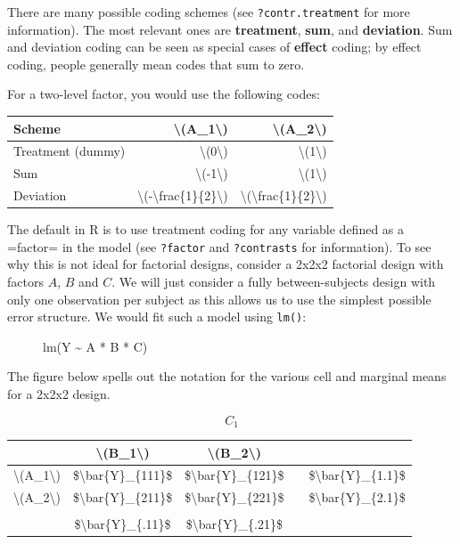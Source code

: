 \documentclass[]{book}
\begin{document}
There are many possible coding schemes (see \texttt{?contr.treatment} for more information). The most relevant ones are \textbf{treatment}, \textbf{sum}, and \textbf{deviation}. Sum and deviation coding can be seen as special cases of \textbf{effect} coding; by effect coding, people generally mean codes that sum to zero.

For a two-level factor, you would use the following codes:

\begin{table}[H]
\centering
\begin{tabular}{l|r|r}
\hline
Scheme & \textbackslash{}(A\_1\textbackslash{}) & \textbackslash{}(A\_2\textbackslash{})\\
\hline
Treatment (dummy) & \textbackslash{}(0\textbackslash{}) & \textbackslash{}(1\textbackslash{})\\
\hline
Sum & \textbackslash{}(-1\textbackslash{}) & \textbackslash{}(1\textbackslash{})\\
\hline
Deviation & \textbackslash{}(-\textbackslash{}frac\{1\}\{2\}\textbackslash{}) & \textbackslash{}(\textbackslash{}frac\{1\}\{2\}\textbackslash{})\\
\hline
\end{tabular}
\end{table}

\begin{description}
\item[The default in R is to use treatment coding for any variable defined as a =factor= in the model (see \texttt{?factor} and \texttt{?contrasts} for information). To see why this is not ideal for factorial designs, consider a 2x2x2 factorial design with factors \(A\), \(B\) and \(C\). We will just consider a fully between-subjects design with only one observation per subject as this allows us to use the simplest possible error structure. We would fit such a model using \texttt{lm()}:]
lm(Y \textasciitilde{} A * B * C)
\end{description}

The figure below spells out the notation for the various cell and marginal means for a 2x2x2 design.

\[C_1\]

\begin{table}[H]
\centering
\begin{tabular}{c|c|c|c|c}
\hline
 & \textbackslash{}(B\_1\textbackslash{}) & \textbackslash{}(B\_2\textbackslash{}) &  & \\
\hline
\textbackslash{}(A\_1\textbackslash{}) & \$\textbackslash{}bar\{Y\}\_\{111\}\$ & \$\textbackslash{}bar\{Y\}\_\{121\}\$ &  & \$\textbackslash{}bar\{Y\}\_\{1.1\}\$\\
\hline
\textbackslash{}(A\_2\textbackslash{}) & \$\textbackslash{}bar\{Y\}\_\{211\}\$ & \$\textbackslash{}bar\{Y\}\_\{221\}\$ &  & \$\textbackslash{}bar\{Y\}\_\{2.1\}\$\\
\hline
 &  &  &  & \\
\hline
 & \$\textbackslash{}bar\{Y\}\_\{.11\}\$ & \$\textbackslash{}bar\{Y\}\_\{.21\}\$ &  & \\
\hline
\end{tabular}
\end{table}
\end{document}
